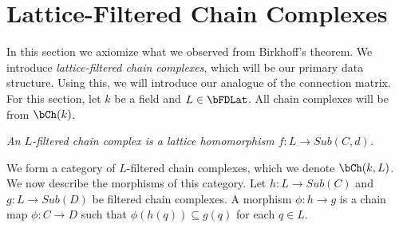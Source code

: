 %
%
%
%
%
%

\section{Lattice-Filtered Chain Complexes}\label{sec:cf}

In this section we axiomize what we observed from Birkhoff's theorem.  We introduce {\em lattice-filtered chain complexes}, which will be our primary data structure.   Using this, we will introduce our analogue of the connection matrix.  For this section, let $k$ be a field and $L\in \bFDLat$.  All chain complexes will be from $\bCh(k)$.

\begin{defn}
{\em
An {\em $L$-filtered chain complex} is a lattice homomorphism $f:L\to Sub(C,d)$.
}
\end{defn}

We form a category of $L$-filtered chain complexes, which we denote $\bCh(k,L)$.  We now describe the morphisms of this category.   Let $h:L\to Sub(C)$ and $g:L\to Sub(D)$ be filtered chain complexes.  A morphism $\phi:h\to g$ is a chain map $\phi:C\to D$ such that $\phi(h(q))\subseteq g(q)$ for each $q\in L$.

